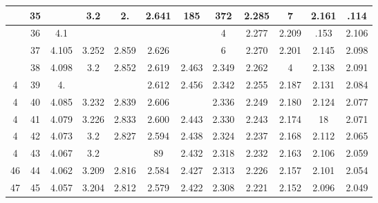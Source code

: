 \documentclass[10pt]{article}
\begin{document}
\begin{CJK*}{UTF8}{bsmi}
\begin{center}
\begin{tabular}{|c|c|c|c|c|c|c|c|c|c|c|c|}
\hline
 & 35 &  & 3.2 & 2. & 2.641 & 185 & 372 & 2.285 & 7 & 2.161 & .114 \\
\hline
 & 36 & 4.1 &  &  &  &  & 4 & 2.277 & 2.209 & .153 & 2.106 \\
\hline
 & 37 & 4.105 & 3.252 & 2.859 & 2.626 &  & 6 & 2.270 & 2.201 & 2.145 & 2.098 \\
\hline
 & 38 & 4.098 & 3.2 & 2.852 & 2.619 & 2.463 & 2.349 & 2.262 & 4 & 2.138 & 2.091 \\
\hline
4 & 39 & 4. &  &  & 2.612 & 2.456 & 2.342 & 2.255 & 2.187 & 2.131 & 2.084 \\
\hline
4 & 40 & 4.085 & 3.232 & 2.839 & 2.606 &  & 2.336 & 2.249 & 2.180 & 2.124 & 2.077 \\
\hline
4 & 41 & 4.079 & 3.226 & 2.833 & 2.600 & 2.443 & 2.330 & 2.243 & 2.174 & 18 & 2.071 \\
\hline
4 & 42 & 4.073 & 3.2 & 2.827 & 2.594 & 2.438 & 2.324 & 2.237 & 2.168 & 2.112 & 2.065 \\
\hline
4 & 43 & 4.067 & 3.2 &  & 89 & 2.432 & 2.318 & 2.232 & 2.163 & 2.106 & 2.059 \\
\hline
46 & 44 & 4.062 & 3.209 & 2.816 & 2.584 & 2.427 & 2.313 & 2.226 & 2.157 & 2.101 & 2.054 \\
\hline
47 & 45 & 4.057 & 3.204 & 2.812 & 2.579 & 2.422 & 2.308 & 2.221 & 2.152 & 2.096 & 2.049 \\
\hline
\end{tabular}
\end{center}


\end{CJK*}
\end{document}
